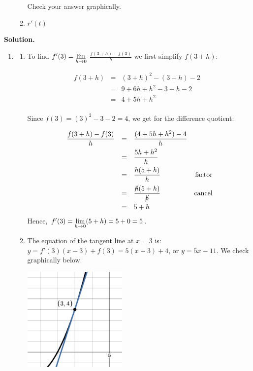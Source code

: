 \documentclass{ximera}
\begin{document}
\begin{ex}
\begin{enumerate}
\begin{enumerate}
 Check your answer graphically.


 \item $r'(t)$ %
 
 \end{enumerate}

\end{enumerate}



{\bf Solution.}
 
\begin{enumerate}

\item \begin{enumerate} \item To find $f'(3) = \ds{\lim_{h \rightarrow 0}}$ $\frac{f(3+h)-f(3)}{h}$ we first simplify $f(3+h)$:

\[ \begin{array}{rclr}  
  f(3+h) & = & (3+h)^2 - (3+h) -2 & \\ 
  & = & 9 + 6h+h^2 - 3 - h -2 & \\
 & = & 4 + 5h + h^2 & \\
 \end{array} \]

Since $f(3) = (3)^2-3-2 = 4$, we get for the difference quotient:

\[ \begin{array}{rclr}

\dfrac{f(3+h)-f(3)}{h} & = & \dfrac{(4 + 5h + h^2) -4}{h} & \\[8pt]
                                & = & \dfrac{5h+h^2}{h} & \\[8pt]
                                & = &  \dfrac{h(5+h)}{h} & \text{factor} \\[8pt]
                                & = &  \dfrac{\cancel{h}(5+h)}{\cancel{h}} & \text{cancel}\\[8pt]
                                & = & 5+h \\ \end{array} \]
 Hence, $f'(3) = \ds{\lim_{h \rightarrow 0} (5+h) = 5+0 = 5}$.
 
 
 \item  The equation of the tangent line at $x = 3$ is:  $y = f'(3)(x-3) + f(3) = 5(x-3) + 4$, or $y = 5x-11$. We check graphically below.
 
 \begin{center}

 \includegraphics[width=2in]{./IntroductiontoDerivativesGraphics/TLEx201.png} 
 

\end{center}
\end{enumerate}
\end{enumerate}
\end{ex}
\end{document}
